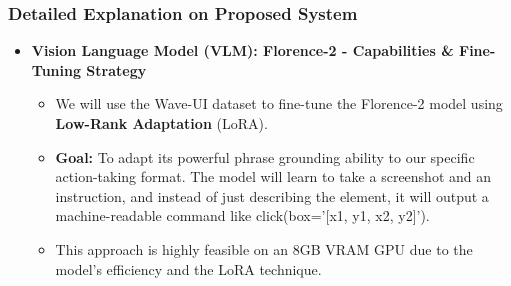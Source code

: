 

\begin{frame}
\frametitle{ Detailed Explanation on Proposed System}

\begin{itemize}
    \item \textbf{Vision Language Model (VLM): Florence-2 - Capabilities \& Fine-Tuning Strategy}
    
    \vspace{0.3cm}
    
    \begin{itemize}
        \item We will use the Wave-UI dataset to fine-tune the Florence-2 model using \textbf{Low-Rank Adaptation} (LoRA).
        
        \vspace{0.25cm}
        
        \item \textbf{Goal:} To adapt its powerful phrase grounding ability to our specific action-taking format. The model will learn to take a screenshot and an instruction, and instead of just describing the element, it will output a machine-readable command like click(box='[x1, y1, x2, y2]').
        
        \vspace{0.25cm}
        
        \item This approach is highly feasible on an 8GB VRAM GPU due to the model's efficiency and the LoRA technique.
    \end{itemize}

\end{itemize}

\end{frame}